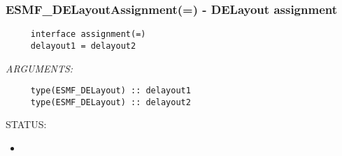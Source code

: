  
\setlength{\oldparskip}{\parskip}
\setlength{\parskip}{1.5ex}
\setlength{\oldparindent}{\parindent}
\setlength{\parindent}{0pt}
\setlength{\oldbaselineskip}{\baselineskip}
\setlength{\baselineskip}{11pt}
 
\def\bv{\begin{verbatim}}
\def\ev{\end{verbatim}}
\def\be{\begin{equation}}
\def\ee{\end{equation}}
\def\bea{\begin{eqnarray}}
\def\eea{\end{eqnarray}}
\def\bi{\begin{itemize}}
\def\ei{\end{itemize}}
\def\bn{\begin{enumerate}}
\def\en{\end{enumerate}}
\def\bd{\begin{description}}
\def\ed{\end{description}}
\def\({\left (}
\def\){\right )}
\def\[{\left [}
\def\]{\right ]}
\def\<{\left  \langle}
\def\>{\right \rangle}
\def\cI{{\cal I}}
\def\diag{\mathop{\rm diag}}
\def\tr{\mathop{\rm tr}}


 
\subsubsection [ESMF\_DELayoutAssignment(=)] {ESMF\_DELayoutAssignment(=) - DELayout assignment}


  
\begin{verbatim}     interface assignment(=)
     delayout1 = delayout2\end{verbatim}{\em ARGUMENTS:}
\begin{verbatim}     type(ESMF_DELayout) :: delayout1
     type(ESMF_DELayout) :: delayout2\end{verbatim}
{\sf STATUS:}
   \begin{itemize}
   \item{}
   \end{itemize}
  
